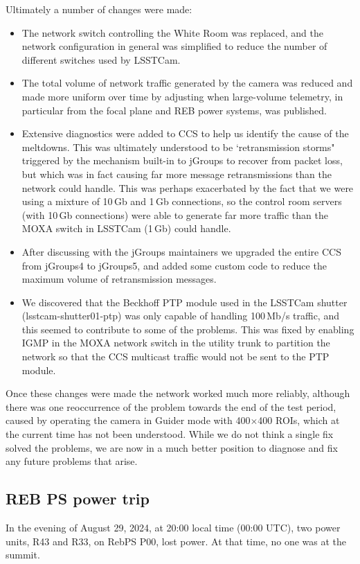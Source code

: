 Ultimately a number of changes were made:

\begin{itemize}
\item The network switch controlling the White Room was replaced, and the network configuration in general was simplified to reduce the number of different switches used by LSSTCam.
\item The total volume of network traffic generated by the camera was reduced and made more uniform over time by adjusting when large-volume telemetry, in particular from the focal plane and REB power systems, was published.
\item Extensive diagnostics were added to CCS to help us identify the cause of the meltdowns. This was ultimately understood to be `retransmission storms" triggered by the mechanism built-in to jGroups to recover from packet loss, but which was in fact causing far more message retransmissions than the network could handle. This was perhaps exacerbated by the fact that we were using a mixture of 10\,Gb and 1\,Gb connections, so the control room servers (with 10\,Gb connections) were able to generate far more traffic than the MOXA switch in LSSTCam (1\,Gb) could handle.
\item After discussing with the jGroups maintainers we upgraded the entire CCS from jGroups4 to jGroups5, and added some custom code to reduce the maximum volume of retransmission messages.
\item We discovered that the Beckhoff PTP module used in the LSSTCam shutter (lsstcam-shutter01-ptp) was only capable of handling 100\,Mb/s traffic, and this seemed to contribute to some of the problems. This was fixed by enabling IGMP in the MOXA network switch in the utility trunk to partition the network so that the CCS multicast traffic would not be sent to the PTP module.
\end{itemize}

Once these changes were made the network worked much more reliably, although there was one reoccurrence of the problem towards the end of the test period, caused by operating the camera in Guider mode with 400$\times$400 ROIs, which at the current time has not been understood. While we do not think a single fix solved the problems, we are now in a much better position to diagnose and fix any future problems that arise.

\clearpage
\subsection{REB PS power trip}\label{sec:rebpstripped}
In the evening of August 29, 2024, at 20:00 local time (00:00 UTC), two power units, R43 and R33, on RebPS P00, lost power. At that time, no one was at the summit.

